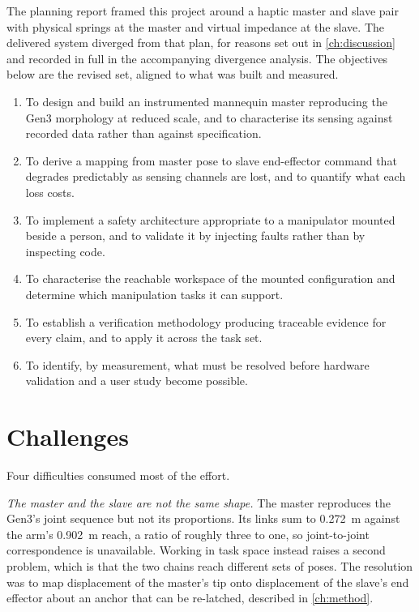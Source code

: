 The planning report framed this project around a haptic master and slave pair
with physical springs at the master and virtual impedance at the slave. The
delivered system diverged from that plan, for reasons set out in
\cref{ch:discussion} and recorded in full in the accompanying divergence
analysis.  The objectives below are the revised
set, aligned to what was built and measured.

\begin{enumerate}
  \item To design and build an instrumented mannequin master reproducing the
    Gen3 morphology at reduced scale, and to characterise its sensing against
    recorded data rather than against specification.
  \item To derive a mapping from master pose to slave end-effector command
    that degrades predictably as sensing channels are lost, and to quantify
    what each loss costs.
  \item To implement a safety architecture appropriate to a manipulator
    mounted beside a person, and to validate it by injecting faults rather
    than by inspecting code.
  \item To characterise the reachable workspace of the mounted configuration
    and determine which manipulation tasks it can support.
  \item To establish a verification methodology producing traceable evidence
    for every claim, and to apply it across the task set.
  \item To identify, by measurement, what must be resolved before hardware
    validation and a user study become possible.
\end{enumerate}

\section{Challenges}

Four difficulties consumed most of the effort.

\emph{The master and the slave are not the same shape.} The master reproduces
the Gen3's joint sequence but not its proportions. Its links sum to
\SI{0.272}{\metre} against the arm's \SI{0.902}{\metre} reach, a ratio of
roughly three to one, so joint-to-joint correspondence is unavailable. Working
in task space instead raises a second problem, which is that the two chains
reach different sets of poses. The resolution was to map displacement of the
master's tip onto displacement of the slave's end effector about an anchor
that can be re-latched, described in \cref{ch:method}.

